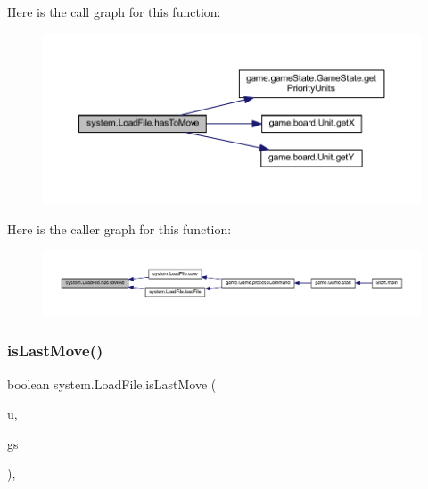 Here is the call graph for this function\+:
\nopagebreak
\begin{figure}[H]
\begin{center}
\leavevmode
\includegraphics[width=350pt]{classsystem_1_1_load_file_a33ddd03f92888eb739d04f70f893e076_cgraph}
\end{center}
\end{figure}
Here is the caller graph for this function\+:
\nopagebreak
\begin{figure}[H]
\begin{center}
\leavevmode
\includegraphics[width=350pt]{classsystem_1_1_load_file_a33ddd03f92888eb739d04f70f893e076_icgraph}
\end{center}
\end{figure}
\mbox{\label{classsystem_1_1_load_file_a5d3c0a0b1a0c4fda2ebb8f992db8eeae}} 
\subsubsection{\texorpdfstring{is\+Last\+Move()}{isLastMove()}}
{\footnotesize\ttfamily boolean system.\+Load\+File.\+is\+Last\+Move (\begin{DoxyParamCaption}\item[{\mbox{\hyperlink{classgame_1_1board_1_1_unit}{Unit}}}]{u,  }\item[{\mbox{\hyperlink{classgame_1_1game_state_1_1_game_state}{Game\+State}}}]{gs }\end{DoxyParamCaption})\hspace{0.3cm}{\ttfamily [inline]}, {\ttfamily [private]}}


